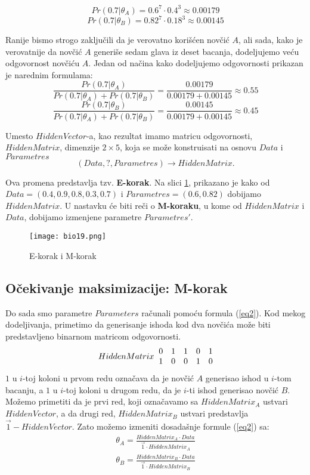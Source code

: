 \documentclass[a4paper]{book}
\begin{document}
$$Pr(0.7|\theta_A) = 0.6^7 \cdot 0.4^3 \approx 0.00179$$ 
$$Pr(0.7|\theta_B)= 0.82^7 \cdot 0.18^3 \approx 0.00145$$

Ranije bismo strogo zaključili da je verovatno korišćen novčić $A$, ali sada, kako je verovatnije da novčić $A$ generiše sedam glava iz deset bacanja, dodeljujemo veću odgovornost novčiću $A$. %
Jedan od načina kako dodeljujemo odgovornosti prikazan je narednim formulama:
$$\frac{Pr(0.7|\theta_A)}{Pr(0.7|\theta_A) + Pr(0.7|\theta_B)} = \frac{0.00179}{0.00179 + 0.00145} \approx 0.55 $$
$$\frac{Pr(0.7|\theta_B)}{Pr(0.7|\theta_A) + Pr(0.7|\theta_B)} = \frac{0.00145}{0.00179 + 0.00145} \approx 0.45 $$

Umesto $HiddenVector$-a, kao rezultat imamo matricu odgovornosti, $HiddenMatrix$, dimenzije $2 \times 5$, %
koja se može konstruisati na osnovu $Data$ i $Parametres$
$$(Data, ? ,Parametres) \rightarrow HiddenMatrix.$$

Ova promena predstavlja tzv. \textbf{E-korak}. Na slici \ref{slika 19}, prikazano je kako od $Data = (0.4, 0.9, 0.8, 0.3, 0.7)$ i $Parametres = (0.6, 0.82)$ dobijamo $HiddenMatrix$. U nastavku će biti reči o \textbf{M-koraku}, u kome od $HiddenMatrix$ i $Data$, dobijamo izmenjene parametre $Parametres'$.
\begin{figure}
    \centering
    \texttt{[image: bio19.png]}
    \caption{E-korak i M-korak}
    \label{slika 19}
\end{figure}

\subsection{Očekivanje maksimizacije: M-korak}

Do sada smo parametre $Parameters$ računali pomoću formula (\ref{eq2}). Kod mekog dodeljivanja, primetimo da generisanje ishoda kod dva novčića može biti predstavljeno binarnom matricom odgovornosti.
$$HiddenMatrix \hspace{0.2cm}
\begin{matrix}
0 & 1 & 1 & 0 & 1 \\
1 & 0 & 0 & 1 & 0
\end{matrix}
$$
$1$ u $i$-toj koloni u prvom redu označava da je novčić $A$ generisao ishod u $i$-tom bacanju, a $1$ u $i$-toj koloni u drugom redu, da je $i$-ti ishod generisao novčić $B$.
Možemo primetiti da je prvi red, koji označavamo sa $HiddenMatrix_A$ ustvari $HiddenVector$, a da drugi red, $HiddenMatrix_B$ ustvari predstavlja $\overrightarrow{1} - HiddenVector$. Zato možemo izmeniti dosadašnje formule (\ref{eq2}) sa:
\begin{equation}
\label{eq3}
\begin{split}
\theta_A = \frac{HiddenMatrix_A \cdot Data}{\overrightarrow{1} \cdot HiddenMatrix_A}\\
\theta_B =\frac{HiddenMatrix_B \cdot Data}{\overrightarrow{1} \cdot HiddenMatrix_B}
\end{split}
\end{equation}
	
\end{document}
